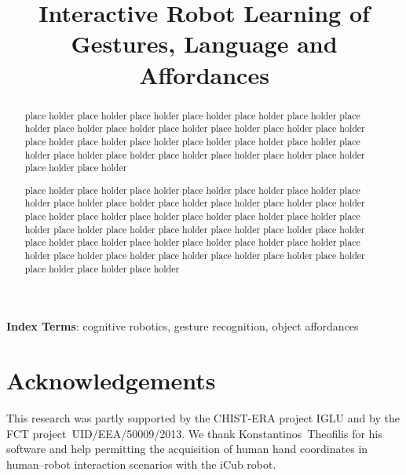 \documentclass[a4paper]{article}
\title{Interactive Robot Learning of Gestures, Language and Affordances}
\newcommand{\hr}{human--robot}
\newcommand{\hri}{\hr{} interaction}
\begin{document}
\maketitle
%
\begin{abstract} %
  place holder place holder place holder place holder place holder place holder place holder
  place holder place holder place holder place holder place holder place holder place holder
  place holder place holder place holder place holder place holder place holder place holder
  place holder place holder place holder place holder place holder place holder place holder

  place holder place holder place holder place holder place holder place holder place holder
  place holder place holder place holder place holder place holder place holder place holder
  place holder place holder place holder place holder place holder place holder place holder
  place holder place holder place holder place holder place holder place holder place holder
  place holder place holder place holder place holder place holder place holder place holder
  place holder place holder place holder place holder place holder place holder place holder
\end{abstract}
\noindent\textbf{Index Terms}: cognitive robotics, gesture recognition, object affordances











\section{Acknowledgements}
This research was partly supported by the CHIST-ERA project IGLU and by the FCT project~UID/EEA/50009/2013.
We thank Konstantinos~Theofilis for his software and help permitting the acquisition of human hand coordinates in \hri{} scenarios with the iCub robot.%

\nocite{*} %

%

\end{document}
